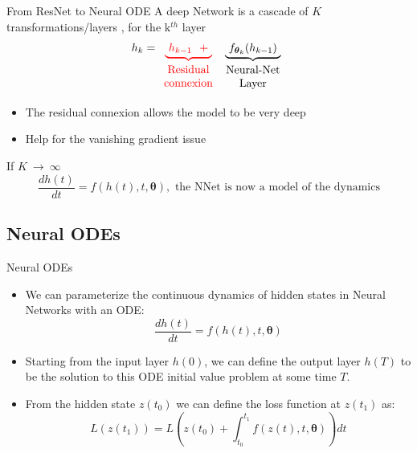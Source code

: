 \documentclass{EESD}
\newcommand{\x}{\ensuremath{h}}
\newcommand{\params}{\ensuremath{\boldsymbol{\theta}}}
\begin{document}
\begin{frame}{From ResNet to Neural ODE}
  A deep Network is a cascade of $K$ transformations/layers , for the k$^{th}$ layer
  $$
  \x_k = { \color{red} \underbrace{\ \x_{k-1}\ \ +\ }_{
      \begin{array}{c}
        \text{Residual}\\
        \text{connexion}
      \end{array}
    } }
  \underbrace{\ f_{\params_k} (\x_{k-1}) \ }_{
    \begin{array}{c}
      \text{Neural-Net}\\
      \text{Layer}
    \end{array}
  }
  $$
  
  \begin{itemize}
  \item The residual connexion allows the model to be very deep 
  \item Help for the vanishing gradient issue
  \end{itemize}


  \begin{alertblock}{If $K \ \longrightarrow\ \infty$}
        $$\frac{dh(t)}{dt} = f(h(t), t, \params), \text{ the NNet is now a model of the dynamics}$$
  \end{alertblock}
  
\end{frame}

\subsection{Neural ODEs}
\begin{frame}[t]{Neural ODEs}
\begin{itemize}
    \item We can parameterize the continuous dynamics of hidden states in Neural Networks with an ODE:\vspace{10pt}
    \begin{equation}
        \frac{dh(t)}{dt} = f(h(t), t, \params) 
    \end{equation}\pause
    \item Starting from the input layer $h(0)$, we can define the output layer $h(T)$ to be the solution to this ODE initial value problem at some time $T$.\vspace{10pt}\pause
    \item From the hidden state $z(t_0)$ we can define the loss function at $z(t_1)$ as:
    \begin{equation}
        L(z(t_1)) = L(z(t_0)+\int_{t_0}^{t_1} f(z(t), t, \params))dt
    \end{equation}\vspace{10pt}
\end{itemize}
\end{frame}
\end{document}
